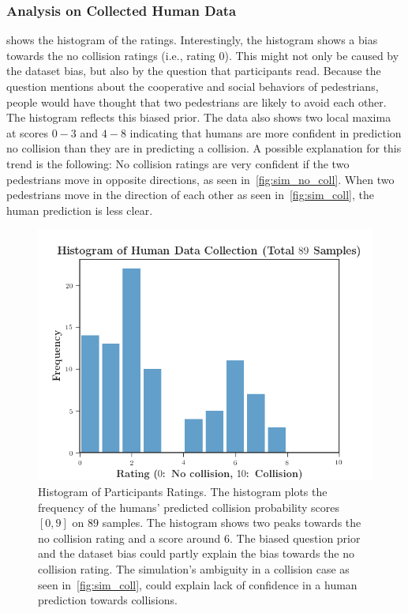 \subsubsection{Analysis on Collected Human Data} 
 shows the histogram of the ratings.
Interestingly, the histogram shows a bias towards the no collision ratings (i.e., rating $0$).
This might not only be caused by the dataset bias, but also by the question that participants read. 
Because the question mentions about the cooperative and social behaviors of pedestrians, people would have thought that two pedestrians are likely to avoid each other. The histogram reflects this biased prior. 
The data also shows two local maxima at scores $0-3$ and $4-8$ indicating that humans are more confident in prediction no collision than they are in predicting a collision. A possible explanation for this trend is the following: No collision ratings are very confident if the two pedestrians move in opposite directions, as seen in~\cref{fig:sim_no_coll}. When two pedestrians move in the direction of each other as seen in~\cref{fig:sim_coll}, the human prediction is less clear. 
\begin{figure}[t]
  \centering
  \includegraphics[width=\linewidth]{figures/human_hist.png}
  \caption{Histogram of Participants Ratings. 
  The histogram plots the frequency of the humans' predicted collision probability scores $[0,9]$ on $89$ samples. The histogram shows two peaks towards the no collision rating and a score around $6$. The biased question prior and the dataset bias could partly explain the bias towards the no collision rating. The simulation's ambiguity in a collision case as seen in~\cref{fig:sim_coll}, could explain lack of confidence in a human prediction towards collisions.}
  \label{fig:histogram-human-data}
\end{figure}

